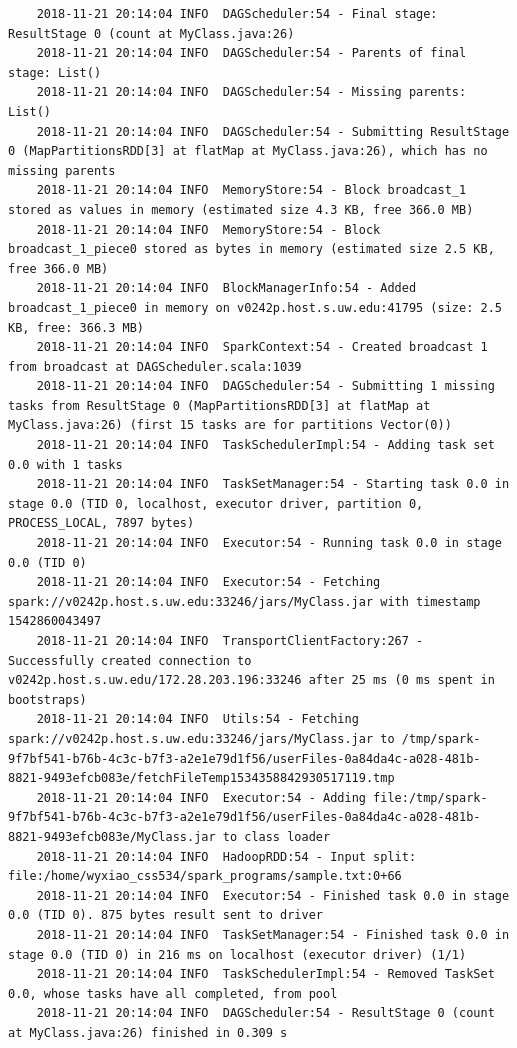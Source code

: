 \documentclass[11pt, letterpaper]{article}
\begin{document}
\begin{lstlisting}
	2018-11-21 20:14:04 INFO  DAGScheduler:54 - Final stage: ResultStage 0 (count at MyClass.java:26)
	2018-11-21 20:14:04 INFO  DAGScheduler:54 - Parents of final stage: List()
	2018-11-21 20:14:04 INFO  DAGScheduler:54 - Missing parents: List()
	2018-11-21 20:14:04 INFO  DAGScheduler:54 - Submitting ResultStage 0 (MapPartitionsRDD[3] at flatMap at MyClass.java:26), which has no missing parents
	2018-11-21 20:14:04 INFO  MemoryStore:54 - Block broadcast_1 stored as values in memory (estimated size 4.3 KB, free 366.0 MB)
	2018-11-21 20:14:04 INFO  MemoryStore:54 - Block broadcast_1_piece0 stored as bytes in memory (estimated size 2.5 KB, free 366.0 MB)
	2018-11-21 20:14:04 INFO  BlockManagerInfo:54 - Added broadcast_1_piece0 in memory on v0242p.host.s.uw.edu:41795 (size: 2.5 KB, free: 366.3 MB)
	2018-11-21 20:14:04 INFO  SparkContext:54 - Created broadcast 1 from broadcast at DAGScheduler.scala:1039
	2018-11-21 20:14:04 INFO  DAGScheduler:54 - Submitting 1 missing tasks from ResultStage 0 (MapPartitionsRDD[3] at flatMap at MyClass.java:26) (first 15 tasks are for partitions Vector(0))
	2018-11-21 20:14:04 INFO  TaskSchedulerImpl:54 - Adding task set 0.0 with 1 tasks
	2018-11-21 20:14:04 INFO  TaskSetManager:54 - Starting task 0.0 in stage 0.0 (TID 0, localhost, executor driver, partition 0, PROCESS_LOCAL, 7897 bytes)
	2018-11-21 20:14:04 INFO  Executor:54 - Running task 0.0 in stage 0.0 (TID 0)
	2018-11-21 20:14:04 INFO  Executor:54 - Fetching spark://v0242p.host.s.uw.edu:33246/jars/MyClass.jar with timestamp 1542860043497
	2018-11-21 20:14:04 INFO  TransportClientFactory:267 - Successfully created connection to v0242p.host.s.uw.edu/172.28.203.196:33246 after 25 ms (0 ms spent in bootstraps)
	2018-11-21 20:14:04 INFO  Utils:54 - Fetching spark://v0242p.host.s.uw.edu:33246/jars/MyClass.jar to /tmp/spark-9f7bf541-b76b-4c3c-b7f3-a2e1e79d1f56/userFiles-0a84da4c-a028-481b-8821-9493efcb083e/fetchFileTemp1534358842930517119.tmp
	2018-11-21 20:14:04 INFO  Executor:54 - Adding file:/tmp/spark-9f7bf541-b76b-4c3c-b7f3-a2e1e79d1f56/userFiles-0a84da4c-a028-481b-8821-9493efcb083e/MyClass.jar to class loader
	2018-11-21 20:14:04 INFO  HadoopRDD:54 - Input split: file:/home/wyxiao_css534/spark_programs/sample.txt:0+66
	2018-11-21 20:14:04 INFO  Executor:54 - Finished task 0.0 in stage 0.0 (TID 0). 875 bytes result sent to driver
	2018-11-21 20:14:04 INFO  TaskSetManager:54 - Finished task 0.0 in stage 0.0 (TID 0) in 216 ms on localhost (executor driver) (1/1)
	2018-11-21 20:14:04 INFO  TaskSchedulerImpl:54 - Removed TaskSet 0.0, whose tasks have all completed, from pool
	2018-11-21 20:14:04 INFO  DAGScheduler:54 - ResultStage 0 (count at MyClass.java:26) finished in 0.309 s

\end{lstlisting}
\end{document}
